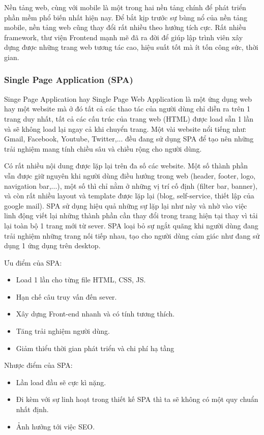 Nền tảng web, cùng với mobile là một trong hai nền tảng chính để phát triển phần mềm phổ biến nhất hiện nay. Để bắt kịp trước sự bùng nổ của nền tảng mobile, nền tảng web cũng thay đổi rất nhiều theo hướng tích cực. Rất nhiều framework, thư viện Frontend mạnh mẽ đã ra đời để giúp lập trình viên xây dựng được những trang web tương tác cao, hiệu suất tốt mà ít tốn công sức, thời gian.
\subsubsection{Single Page Application (SPA)}
Singe Page Application hay Single Page Web Application là một ứng dụng web hay một website mà ở đó tất cả các thao tác của người dùng chỉ diễn ra trên 1 trang duy nhất, tất cả các cấu trúc của trang web (HTML) được load sẵn 1 lần và sẽ không load lại ngay cả khi chuyển trang. Một vài website nổi tiếng như: Gmail, Facebook, Youtube, Twitter,... đều đang sử dụng SPA để tạo nên những trải nghiệm mang tính chiều sâu và chiều rộng cho người dùng.\par
Có rất nhiều nội dung được lặp lại trên đa số các website. Một số thành phần vẫn được giữ nguyên khi người dùng điều hướng trong web (header, footer, logo, navigation bar,...), một số thì chỉ nằm ở những vị trí cố định (filter bar, banner), và còn rất nhiều layout và template được lặp lại (blog, self-service, thiết lập của google mail). SPA sử dụng hiệu quả những sự lặp lại như này và nhờ vào việc linh động viết lại những thành phần cần thay đổi trong trang hiện tại thay vì tải lại toàn bộ 1 trang mới từ sever. SPA loại bỏ sự ngắt quãng khi người dùng đang trải nghiệm những trang nối tiếp nhau, tạo cho người dùng cảm giác như đang sử dụng 1 ứng dụng trên desktop.\par
Ưu điểm của SPA:
\begin{itemize}
    \item Load 1 lần cho từng file HTML, CSS, JS.
    \item Hạn chế câu truy vấn đến sever.
    \item Xây dựng Front-end nhanh và có tính tương thích.
    \item Tăng trải nghiệm người dùng.
    \item Giảm thiểu thời gian phát triển và chi phí hạ tầng
\end{itemize}
Nhược điểm của SPA:
\begin{itemize}
    \item Lần load đầu sẽ cực kì nặng.
    \item Đi kèm với sự linh hoạt trong thiết kế SPA thì ta sẽ không có một quy chuẩn nhất định.
    \item Ảnh hưởng tới việc SEO.
\end{itemize}
